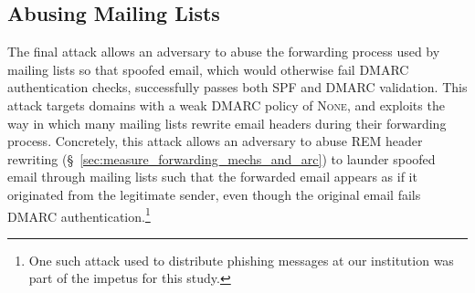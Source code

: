





\subsection{Abusing Mailing Lists}
\label{subsec:attack_none_mailing_list}

The final attack allows an adversary to abuse the forwarding process
used by mailing lists so that spoofed email, which would otherwise
fail DMARC authentication checks, successfully passes both SPF and
DMARC validation.
This attack targets domains with a weak DMARC policy of \textsc{None},
and exploits the way in which many mailing lists rewrite email headers during their forwarding process.
Concretely, this attack allows an adversary to abuse REM header rewriting (\S~\ref{sec:measure_forwarding_mechs_and_arc}) to launder spoofed email through mailing lists such that the forwarded email appears as if it originated from the legitimate sender, even though the original email fails DMARC authentication.\footnote{One such attack used to distribute phishing messages at our institution was part of the impetus for this study.}


